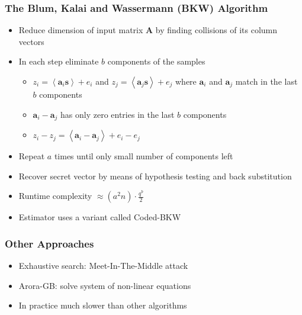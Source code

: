 \documentclass[t, aspectratio=169]{beamer}
\begin{document}
\begin{frame}
    \frametitle{The Blum, Kalai and Wassermann (BKW) Algorithm}
    \begin{itemize}[<+->]
        \item Reduce dimension of input matrix $\mathbf{A}$ by finding collisions of its column vectors
        \item In each step eliminate $b$ components of the samples
              \begin{itemize}[<+->]
                  \item $z_i = \left\langle \mathbf{a}_i \mathbf{s}\right\rangle + e_i$ and $z_j = \left\langle \mathbf{a}_j \mathbf{s}\right\rangle + e_j$ where $\mathbf{a}_i$ and $\mathbf{a}_j$ match in the last $b$ components
                  \item $\mathbf{a}_i - \mathbf{a}_j$ has only zero entries in the last $b$ components
                  \item $z_i - z_j = \left\langle \mathbf{a}_i - \mathbf{a}_j\right\rangle + e_i - e_j$
              \end{itemize}
        \item Repeat $a$ times until only small number of components left
        \item Recover secret vector by means of hypothesis testing and back substitution
        \item Runtime complexity $\approx \left(a^2 n\right) \cdot \frac{q^b}{2}$ %
        \item Estimator uses a variant called Coded-BKW%
    \end{itemize}
\end{frame}

\begin{frame}
    \frametitle{Other Approaches}
    \begin{itemize}[<+->]
        \item Exhaustive search: Meet-In-The-Middle attack
        \item Arora-GB: solve system of non-linear equations
        \item In practice much slower than other algorithms
    \end{itemize}
\end{frame}
\end{document}
